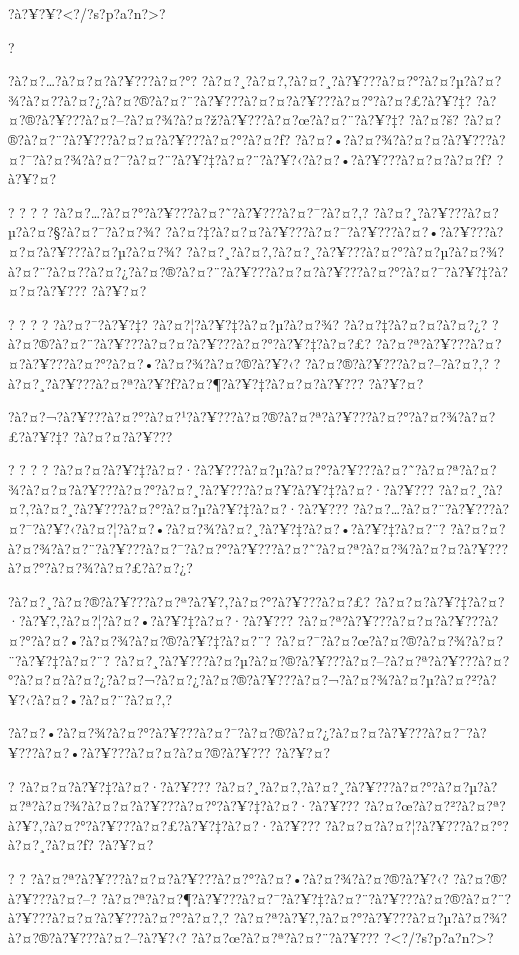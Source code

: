 \documentclass[11pt, openany]{book}
\begin{document}
{{{{{{{{{{{{{{{{{?à?¥?¥?\textless{}?/?s?p?a?n?\textgreater{}?

?

?à?¤?\ldots{}?à?¤?¤?à?¥???à?¤?°?
?à?¤?¸?à?¤?‚?à?¤?¸?à?¥???à?¤?°?à?¤?µ?à?¤?¾?à?¤?­?à?¤?¿?à?¤?®?à?¤?¨?à?¥???à?¤?¤?à?¥???à?¤?°?à?¤?£?à?¥?‡?
?à?¤?®?à?¥???à?¤?--?à?¤?¾?à?¤?ž?à?¥???à?¤?œ?à?¤?¨?à?¥?‡? ?à?¤?š?
?à?¤?®?à?¤?¨?à?¥???à?¤?¤?à?¥???à?¤?°?à?¤?ƒ?
?à?¤?•?à?¤?¾?à?¤?¤?à?¥???à?¤?¯?à?¤?¾?à?¤?¯?à?¤?¨?à?¥?‡?à?¤?¨?à?¥?‹?à?¤?•?à?¥???à?¤?¤?à?¤?ƒ?
?à?¥?¤?

? ? ? ? ?à?¤?\ldots{}?à?¤?°?à?¥???à?¤?˜?à?¥???à?¤?¯?à?¤?‚?
?à?¤?¸?à?¥???à?¤?µ?à?¤?§?à?¤?¯?à?¤?¾?
?à?¤?‡?à?¤?¤?à?¥???à?¤?¯?à?¥???à?¤?•?à?¥???à?¤?¤?à?¥???à?¤?µ?à?¤?¾?
?à?¤?¸?à?¤?‚?à?¤?¸?à?¥???à?¤?°?à?¤?µ?à?¤?¾?à?¤?¨?à?¤?­?à?¤?¿?à?¤?®?à?¤?¨?à?¥???à?¤?¤?à?¥???à?¤?°?à?¤?¯?à?¥?‡?à?¤?¤?à?¥???
?à?¥?¤?

? ? ? ? ?à?¤?¯?à?¥?‡? ?à?¤?¦?à?¥?‡?à?¤?µ?à?¤?¾? ?à?¤?‡?à?¤?¤?à?¤?¿?
?à?¤?®?à?¤?¨?à?¥???à?¤?¤?à?¥???à?¤?°?à?¥?‡?à?¤?£?
?à?¤?ª?à?¥???à?¤?¤?à?¥???à?¤?°?à?¤?•?à?¤?¾?à?¤?®?à?¥?‹?
?à?¤?®?à?¥???à?¤?--?à?¤?‚?
?à?¤?¸?à?¥???à?¤?ª?à?¥?ƒ?à?¤?¶?à?¥?‡?à?¤?¤?à?¥??? ?à?¥?¤?

?à?¤?¬?à?¥???à?¤?°?à?¤?¹?à?¥???à?¤?®?à?¤?ª?à?¥???à?¤?°?à?¤?¾?à?¤?£?à?¥?‡?
?à?¤?¤?à?¥???

? ? ? ?
?à?¤?¤?à?¥?‡?à?¤?·?à?¥???à?¤?µ?à?¤?°?à?¥???à?¤?˜?à?¤?ª?à?¤?¾?à?¤?¤?à?¥???à?¤?°?à?¤?¸?à?¥???à?¤?¥?à?¥?‡?à?¤?·?à?¥???
?à?¤?¸?à?¤?‚?à?¤?¸?à?¥???à?¤?°?à?¤?µ?à?¥?‡?à?¤?·?à?¥???
?à?¤?\ldots{}?à?¤?¨?à?¥???à?¤?¯?à?¥?‹?à?¤?¦?à?¤?•?à?¤?¾?à?¤?¸?à?¥?‡?à?¤?•?à?¥?‡?à?¤?¨?
?à?¤?¤?à?¤?¾?à?¤?¨?à?¥???à?¤?¯?à?¤?°?à?¥???à?¤?˜?à?¤?ª?à?¤?¾?à?¤?¤?à?¥???à?¤?°?à?¤?¾?à?¤?£?à?¤?¿?

?à?¤?¸?à?¤?®?à?¥???à?¤?ª?à?¥?‚?à?¤?°?à?¥???à?¤?£?
?à?¤?¤?à?¥?‡?à?¤?·?à?¥?‚?à?¤?¦?à?¤?•?à?¥?‡?à?¤?·?à?¥???
?à?¤?ª?à?¥???à?¤?¤?à?¥???à?¤?°?à?¤?•?à?¤?¾?à?¤?®?à?¥?‡?à?¤?¨?
?à?¤?¯?à?¤?œ?à?¤?®?à?¤?¾?à?¤?¨?à?¥?‡?à?¤?¨?
?à?¤?¸?à?¥???à?¤?µ?à?¤?®?à?¥???à?¤?--?à?¤?ª?à?¥???à?¤?°?à?¤?¤?à?¤?¿?à?¤?¬?à?¤?¿?à?¤?®?à?¥???à?¤?¬?à?¤?¾?à?¤?µ?à?¤?²?à?¥?‹?à?¤?•?à?¤?¨?à?¤?‚?

?à?¤?•?à?¤?¾?à?¤?°?à?¥???à?¤?¯?à?¤?®?à?¤?¿?à?¤?¤?à?¥???à?¤?¯?à?¥???à?¤?•?à?¥???à?¤?¤?à?¤?®?à?¥???
?à?¥?¤?

? ?à?¤?¤?à?¥?‡?à?¤?·?à?¥???
?à?¤?¸?à?¤?‚?à?¤?¸?à?¥???à?¤?°?à?¤?µ?à?¤?ª?à?¤?¾?à?¤?¤?à?¥???à?¤?°?à?¥?‡?à?¤?·?à?¥???
?à?¤?œ?à?¤?²?à?¤?ª?à?¥?‚?à?¤?°?à?¥???à?¤?£?à?¥?‡?à?¤?·?à?¥???
?à?¤?¤?à?¤?¦?à?¥???à?¤?°?à?¤?¸?à?¤?ƒ? ?à?¥?¤?

? ? ?à?¤?ª?à?¥???à?¤?¤?à?¥???à?¤?°?à?¤?•?à?¤?¾?à?¤?®?à?¥?‹?
?à?¤?®?à?¥???à?¤?--?
?à?¤?ª?à?¤?¶?à?¥???à?¤?¯?à?¥?‡?à?¤?¨?à?¥???à?¤?®?à?¤?¨?à?¥???à?¤?¤?à?¥???à?¤?°?à?¤?‚?
?à?¤?ª?à?¥?‚?à?¤?°?à?¥???à?¤?µ?à?¤?¾?à?¤?®?à?¥???à?¤?--?à?¥?‹?
?à?¤?œ?à?¤?ª?à?¤?¨?à?¥??? ?\textless{}?/?s?p?a?n?\textgreater{}?

}}}}}}}}}}}}}}}}}
\end{document}
